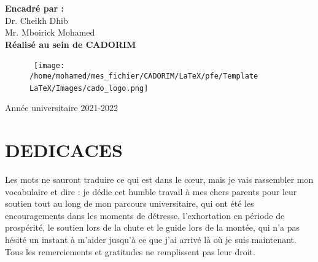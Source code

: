 \documentclass[a4paper, 12pt]{report}
\begin{document}
\begin{titlepage}
\begin{center}
			{\bf Encadré par :}\\
			{Dr. Cheikh Dhib} \\
			{Mr. Mboirick Mohamed} \\
			{\bf Réalisé au sein de CADORIM }
			
			
		\end{center}
		\begin{figure}[htbp]
		\hbox{
			\hspace*{5cm}
			\texttt{[image: /home/mohamed/mes\_fichier/CADORIM/LaTeX/pfe/Template LaTeX/Images/cado\_logo.png]}
		} 
		\end{figure}
		
		\begin{center}
			Année universitaire 2021-2022
		\end{center}
	\end{titlepage}
		\chapter*{DEDICACES} \label{chap:1Dedicaces}
		Les mots ne sauront traduire ce qui est dans le cœur, mais je vais rassembler mon vocabulaire et dire : je dédie cet humble travail à mes chers parents pour leur soutien tout au long de mon parcours universitaire, qui ont été les encouragements dans les moments de détresse, l'exhortation en période de prospérité, le soutien lors de la chute et le guide lors de la montée, qui n'a pas hésité un instant à m'aider jusqu'à ce que j'ai arrivé là où je suis maintenant. Tous les remerciements et gratitudes ne remplissent pas leur droit.
		\thispagestyle{empty} 
\end{document}
